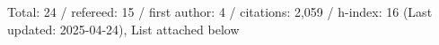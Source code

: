 Total: 24 / refereed: 15 / first author: 4 / citations: 2,059 / h-index: 16 (Last updated: 2025-04-24), List attached below
